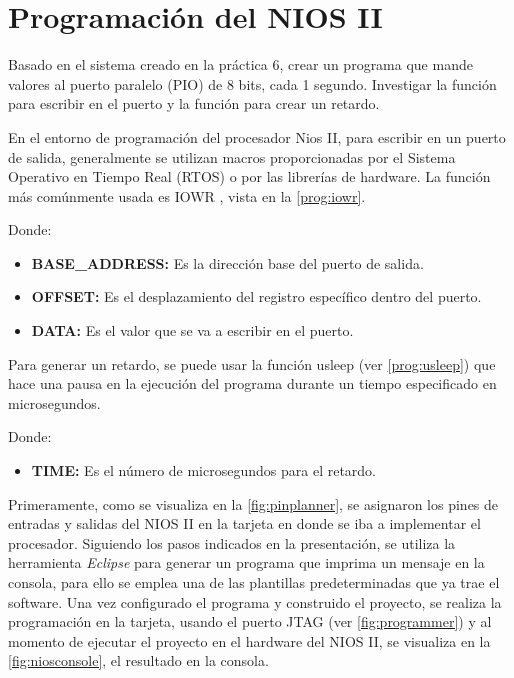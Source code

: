 \section{Programación del NIOS II \label{sec:s1}}

\begin{center}
	\begin{minipage}{12cm}
		\begin{tcolorbox}[title=Actividad 1]
			Basado en el sistema creado en la práctica 6, crear un programa que mande valores al puerto paralelo (PIO) de 8 bits, cada 1 segundo. Investigar la función para escribir en el puerto y la función para crear un retardo.
		\end{tcolorbox}	
	\end{minipage}
\end{center}

En el entorno de programación del procesador Nios II, para escribir en un puerto de salida, generalmente se utilizan macros proporcionadas por el Sistema Operativo en Tiempo Real (RTOS) o por las librerías de hardware. La función más comúnmente usada es IOWR \cite{IO}, vista en la \autoref{prog:iowr}.



Donde:
\begin{itemize}
	\item \textbf{BASE\_ADDRESS:} Es la dirección base del puerto de salida.
	\item \textbf{OFFSET:} Es el desplazamiento del registro específico dentro del puerto.
	\item \textbf{DATA:} Es el valor que se va a escribir en el puerto.
\end{itemize}

Para generar un retardo, se puede usar la función usleep (ver \autoref{prog:usleep}) que hace una pausa en la ejecución del programa durante un tiempo especificado en microsegundos. \cite{delay}



Donde:
\begin{itemize}
	\item \textbf{TIME:} Es el número de microsegundos para el retardo.
\end{itemize} 

Primeramente, como se visualiza en la \autoref{fig:pinplanner}, se asignaron los pines de entradas y salidas del NIOS II en la tarjeta en donde se iba a implementar el procesador. Siguiendo los pasos indicados en la presentación, se utiliza la herramienta \textit{Eclipse} para generar un programa que imprima un mensaje en la consola, para ello se emplea una de las plantillas predeterminadas que ya trae el software. Una vez configurado el programa y construido el proyecto, se realiza la programación en la tarjeta, usando el puerto JTAG (ver \autoref{fig:programmer}) y al momento de ejecutar el proyecto en el hardware del NIOS II, se visualiza en la \autoref{fig:niosconsole}, el resultado en la consola.

